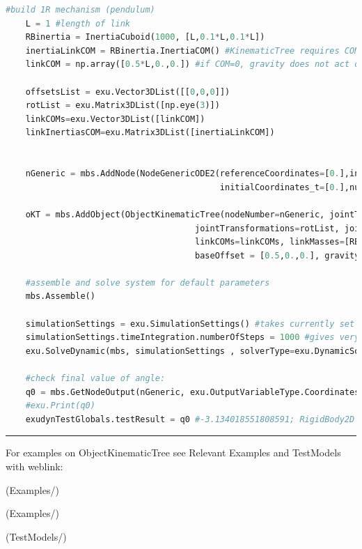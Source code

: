 \begin{lstlisting}[language=Python, firstnumber=1]
    #build 1R mechanism (pendulum)
    L = 1 #length of link
    RBinertia = InertiaCuboid(1000, [L,0.1*L,0.1*L])
    inertiaLinkCOM = RBinertia.InertiaCOM() #KinematicTree requires COM inertia
    linkCOM = np.array([0.5*L,0.,0.]) #if COM=0, gravity does not act on pendulum!

    offsetsList = exu.Vector3DList([[0,0,0]])
    rotList = exu.Matrix3DList([np.eye(3)])
    linkCOMs=exu.Vector3DList([linkCOM])
    linkInertiasCOM=exu.Matrix3DList([inertiaLinkCOM])
    
    
    nGeneric = mbs.AddNode(NodeGenericODE2(referenceCoordinates=[0.],initialCoordinates=[0.],
                                           initialCoordinates_t=[0.],numberOfODE2Coordinates=1))

    oKT = mbs.AddObject(ObjectKinematicTree(nodeNumber=nGeneric, jointTypes=[exu.JointType.RevoluteZ], linkParents=[-1],
                                      jointTransformations=rotList, jointOffsets=offsetsList, linkInertiasCOM=linkInertiasCOM,
                                      linkCOMs=linkCOMs, linkMasses=[RBinertia.mass], 
                                      baseOffset = [0.5,0.,0.], gravity=[0.,-9.81,0.]))

    #assemble and solve system for default parameters
    mbs.Assemble()
    
    simulationSettings = exu.SimulationSettings() #takes currently set values or default values
    simulationSettings.timeIntegration.numberOfSteps = 1000 #gives very accurate results
    exu.SolveDynamic(mbs, simulationSettings , solverType=exu.DynamicSolverType.RK67) #highly accurate!

    #check final value of angle:
    q0 = mbs.GetNodeOutput(nGeneric, exu.OutputVariableType.Coordinates)
    #exu.Print(q0)
    exudynTestGlobals.testResult = q0 #-3.134018551808591; RigidBody2D with 2e6 time steps gives: -3.134018551809384
\end{lstlisting}

\vspace{6pt}\par\noindent\rule{\textwidth}{0.4pt}
%
\noindent For examples on ObjectKinematicTree see Relevant Examples and TestModels with weblink:
\bi
\item {} (Examples/)
\item {} (Examples/)
\item {} (TestModels/)

